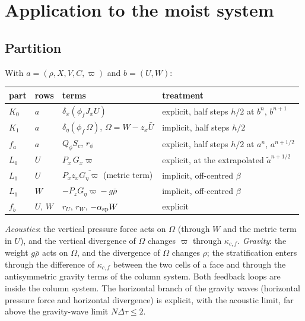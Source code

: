 \documentclass[11pt,a4paper]{article}
\newcommand{\dtau}{\Delta\tau}
\newcommand{\pv}{\varpi}      %
\begin{document}
\section{Application to the moist system}\label{sec:apply}
\subsection{Partition}
With $a=(\rho,X,V,C,\pv)$ and $b=(U,W)$:
\begin{center}\small
\begin{tabular}{llll}\toprule
part & rows & terms & treatment\\\midrule
$K_0$ & $a$ & $\delta_x(\phi_fJ_xU)$ & explicit, half steps $h/2$ at $b^n$, $b^{n+1}$\\
$K_1$ & $a$ & $\delta_\eta(\phi_f\,\Omega)$, $\Omega=W-z_x\bar U$ & implicit, half steps $h/2$\\
$f_a$ & $a$ & $Q_\phi S_c$, $r_\phi$ & explicit, half steps $h/2$ at $a^n$, $a^{n+1/2}$\\
$L_0$ & $U$ & $P_x\,G_x\pv$ & explicit, at the extrapolated $\tilde a^{n+1/2}$\\
$L_1$ & $U$ & $P_xz_x\overline{G_\eta\pv}$ (metric term) & implicit, off-centred $\beta$\\
$L_1$ & $W$ & $-P_zG_\eta\pv-g\bar\rho$ & implicit, off-centred $\beta$\\
$f_b$ & $U$, $W$ & $r_U$, $r_W$, $-\alpha_{\rm sp}W$ & explicit\\\bottomrule
\end{tabular}
\end{center}
\emph{Acoustics}: the vertical pressure force acts on $\Omega$ (through $W$ and the metric term in $U$),
and the vertical divergence of $\Omega$ changes $\pv$ through $\kappa_{c,f}$. \emph{Gravity}: the weight
$g\bar\rho$ acts on $\Omega$, and the divergence of $\Omega$ changes $\rho$; the stratification enters through
the difference of $\kappa_{c,f}$ between the two cells of a face and through the antisymmetric gravity
terms of the column system. Both feedback loops are inside the column system. The horizontal branch
of the gravity waves (horizontal pressure force and horizontal divergence) is explicit, with the
acoustic limit, far above the gravity-wave limit $N\dtau\le2$.
\end{document}
